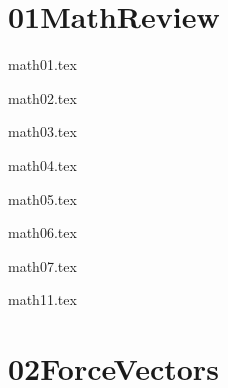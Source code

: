 \documentclass[9pt,xcolor={svgnames, x11names}]{beamer}
\def\scale{1} %
\begin{document}
\section{01MathReview}
\begin{frame}{math01.tex}
	\def\scale{0.8}
	\centering
	
\end{frame}
\begin{frame}{math02.tex}
	\def\scale{0.8}
	\centering
	
\end{frame}
\begin{frame}{math03.tex}
	\def\scale{0.8}
	\centering
	
\end{frame}
\begin{frame}{math04.tex}
	\def\scale{0.8}
	\centering
	
\end{frame}
\begin{frame}{math05.tex}
	\def\scale{0.8}
	\centering
	
\end{frame}
\begin{frame}{math06.tex}
	\def\scale{0.8}
	\centering
	
\end{frame}
\begin{frame}{math07.tex}
	\def\scale{0.8}
	\centering
	
\end{frame}
\begin{frame}{math11.tex}
	\def\scale{0.8}
	\centering
	
\end{frame}



\section{02ForceVectors}
\end{document}
